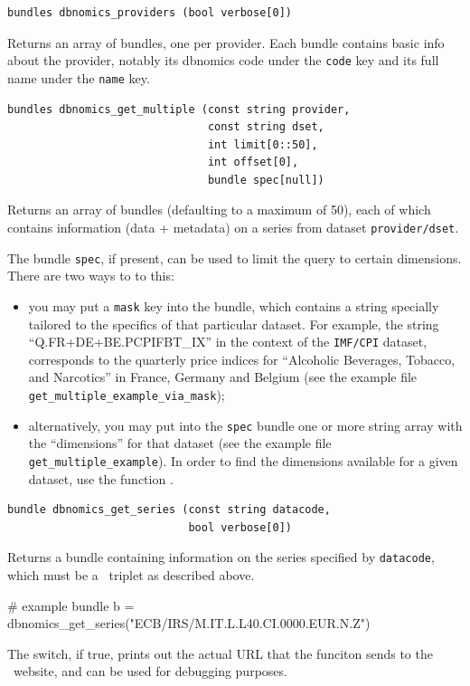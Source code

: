 \documentclass{article}
\begin{document}
\begin{funcdoc}
\begin{verbatim}
bundles dbnomics_providers (bool verbose[0])
\end{verbatim}
Returns an array of bundles, one per provider. Each bundle contains
basic info about the provider, notably its dbnomics code under the
\texttt{code} key and its full name under the \texttt{name} key.
\end{funcdoc}

\begin{funcdoc}
\begin{verbatim}
bundles dbnomics_get_multiple (const string provider,
                               const string dset,
                               int limit[0::50],
                               int offset[0],
                               bundle spec[null])
\end{verbatim}
  Returns an array of bundles (defaulting to a maximum of 50), each of
  which contains information (data + metadata) on a series from
  dataset \texttt{provider/dset}.

  The bundle \texttt{spec}, if present, can be used to limit the query
  to certain dimensions. There are two ways to to this:
  \begin{itemize}
  \item you may put a \texttt{mask} key into the bundle, which
    contains a string specially tailored to the specifics of that
    particular dataset. For example, the string
    ``Q.FR+DE+BE.PCPIFBT\_IX'' in the context of the \texttt{IMF/CPI}
    dataset, corresponds to the quarterly price indices for
    ``Alcoholic Beverages, Tobacco, and Narcotics'' in France, Germany
    and Belgium (see the example file
    \texttt{get\_multiple\_example\_via\_mask});
  \item alternatively, you may put into the \texttt{spec} bundle one
    or more string array with the ``dimensions'' for that dataset (see
    the example file \texttt{get\_multiple\_example}).  In order to
    find the dimensions available for a given dataset, use the
    function .
  \end{itemize}

\end{funcdoc}

\begin{funcdoc}
\begin{verbatim}
bundle dbnomics_get_series (const string datacode,
                            bool verbose[0])
\end{verbatim}
Returns a bundle containing information on the series specified by
\texttt{datacode}, which must be a \DB\ triplet as
described above.
\begin{code}
# example
bundle b = dbnomics_get_series("ECB/IRS/M.IT.L.L40.CI.0000.EUR.N.Z")
\end{code}
The  switch, if true, prints out the actual URL that the
funciton sends to the \DB\ website, and can be used for debugging purposes.
\end{funcdoc}
\end{document}
